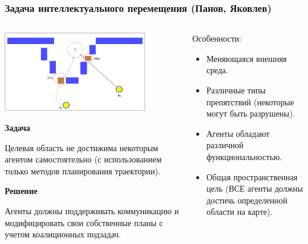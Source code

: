 \documentclass[default]{beamer}
\begin{document}
	\begin{frame}
		\frametitle{Задача интеллектуального перемещения \footnotesize (Панов, Яковлев)}
		
		\begin{columns}
			\begin{column}{0.55\textwidth}
				\begin{center}
					\includegraphics[page=1,width=0.8\textwidth]{examples/slides_colored}
				\end{center}
				\vspace{-7pt}
				\small
				\textbf{Задача}
				
				Целевая область не достижима некоторым агентом самостоятельно (с использованием только методов планирования траектории).
				
				\textbf{Решение}
				
				Агенты должны поддерживать коммуникацию и модифицировать свои собственные планы с учетом коалиционных подзадач.
				
			\end{column}
			\begin{column}{0.45\textwidth}
				Особенности:
				\begin{itemize}
					\item Меняющаяся внешняя среда.
					\item Различные типы препятствий (некоторые могут быть разрушены).
					\item Агенты обладают различной функциональностью.
					\item Общая пространственная цель (ВСЕ агенты должны достичь определенной области на карте).
				\end{itemize}
			
			\end{column}
		\end{columns}
	\end{frame}
	
\end{document}
